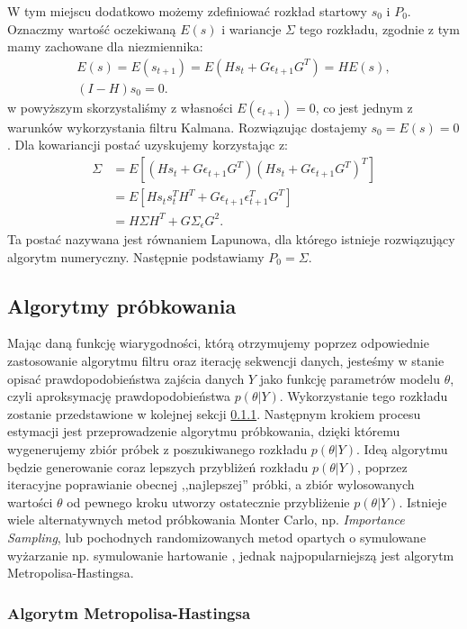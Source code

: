 W tym miejscu dodatkowo możemy zdefiniować rozkład startowy $s_0$ i $P_0$. Oznaczmy wartość oczekiwaną $E(s)$ i wariancje $\Sigma$ tego rozkładu, zgodnie z tym mamy zachowane dla niezmiennika:
\begin{gather}
    E(s) = E(s_{t+1}) = E(H s_t + G \epsilon_{t+1} G^T) = H E(s),\\
    (I - H) s_0 = 0.
\end{gather}
w powyższym skorzystaliśmy z własności $E(\epsilon_{t+1}) = 0$, co jest jednym z warunków wykorzystania filtru Kalmana. Rozwiązując dostajemy $s_0 = E(s) = 0$.
Dla kowariancji postać uzyskujemy korzystając z:
\begin{align}
    \Sigma &= E \left[ (H s_t + G \epsilon_{t+1} G^T) (H s_t + G \epsilon_{t+1} G^T)^T\right]\\
    &= E \left[ H s_t s_t^T H^T + G \epsilon_{t+1} \epsilon_{t+1}^T G^T\right]\\
    &= H \Sigma H^T + G \Sigma_{\epsilon} G^2.
\end{align}
Ta postać nazywana jest równaniem Lapunowa, dla którego istnieje rozwiązujący algorytm numeryczny. Następnie podstawiamy $P_0 = \Sigma$.

\subsection{Algorytmy próbkowania}

Mając daną funkcję wiarygodności, którą otrzymujemy poprzez odpowiednie zastosowanie algorytmu filtru oraz iterację sekwencji danych, jesteśmy w stanie opisać prawdopodobieństwa zajścia danych $Y$ jako funkcję parametrów modelu $\theta$, czyli aproksymację prawdopodobieństwa $p(\theta|Y)$. Wykorzystanie tego rozkładu zostanie przedstawione w kolejnej sekcji \ref{sec:metropolis_hastings}. Następnym krokiem procesu estymacji jest przeprowadzenie algorytmu próbkowania, dzięki któremu wygenerujemy zbiór próbek z poszukiwanego rozkładu $p(\theta|Y)$. Ideą algorytmu będzie generowanie coraz lepszych przybliżeń rozkładu $p(\theta|Y)$, poprzez iteracyjne poprawianie obecnej ,,najlepszej'' próbki, a zbiór wylosowanych wartości $\theta$ od pewnego kroku utworzy ostatecznie przybliżenie $p(\theta|Y)$. Istnieje wiele alternatywnych metod próbkowania Monter Carlo, np. \emph{Importance Sampling}\cite{herbst}, lub pochodnych randomizowanych metod opartych o symulowane wyżarzanie np. symulowanie hartowanie \cite{herbst2}, jednak najpopularniejszą jest algorytm Metropolisa-Hastingsa.

\subsubsection{Algorytm Metropolisa-Hastingsa}
\label{sec:metropolis_hastings}

